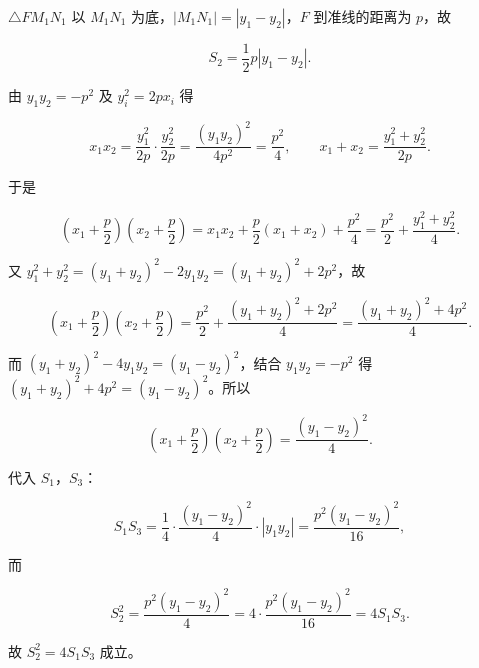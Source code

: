 \begin{answer}
$\triangle FM_1N_1$ 以 $M_1N_1$ 为底，$|M_1N_1|=|y_1-y_2|$，$F$ 到准线的距离为 $p$，故

\nopagebreak[4]
\[S_2=\frac12p|y_1-y_2|.\]

由 $y_1y_2=-p^2$ 及 $y_i^2=2px_i$ 得

\nopagebreak[4]
\[x_1x_2=\frac{y_1^2}{2p}\cdot\frac{y_2^2}{2p}=\frac{(y_1y_2)^2}{4p^2}=\frac{p^2}{4},\qquad
x_1+x_2=\frac{y_1^2+y_2^2}{2p}.\]

于是

\nopagebreak[4]
\[\left(x_1+\frac p2\right)\left(x_2+\frac p2\right)
=x_1x_2+\frac p2(x_1+x_2)+\frac{p^2}{4}
=\frac{p^2}{2}+\frac{y_1^2+y_2^2}{4}.\]

又 $y_1^2+y_2^2=(y_1+y_2)^2-2y_1y_2=(y_1+y_2)^2+2p^2$，故

\nopagebreak[4]
\[\left(x_1+\frac p2\right)\left(x_2+\frac p2\right)
=\frac{p^2}{2}+\frac{(y_1+y_2)^2+2p^2}{4}
=\frac{(y_1+y_2)^2+4p^2}{4}.\]

而 $(y_1+y_2)^2-4y_1y_2=(y_1-y_2)^2$，结合 $y_1y_2=-p^2$ 得 $(y_1+y_2)^2+4p^2=(y_1-y_2)^2$。所以

\nopagebreak[4]
\[\left(x_1+\frac p2\right)\left(x_2+\frac p2\right)=\frac{(y_1-y_2)^2}{4}.\]

代入 $S_1$，$S_3$：

\nopagebreak[4]
\[S_1S_3=\frac14\cdot\frac{(y_1-y_2)^2}{4}\cdot|y_1y_2|
=\frac{p^2(y_1-y_2)^2}{16},\]

而

\nopagebreak[4]
\[S_2^2=\frac{p^2(y_1-y_2)^2}{4}=4\cdot\frac{p^2(y_1-y_2)^2}{16}=4S_1S_3.\]

故 $S_2^2=4S_1S_3$ 成立。


\end{answer}
